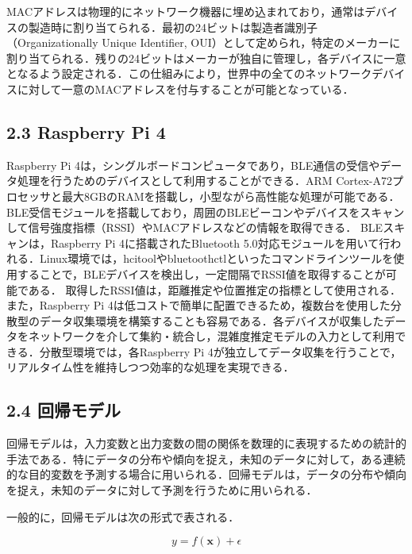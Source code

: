 MACアドレスは物理的にネットワーク機器に埋め込まれており，通常はデバイスの製造時に割り当てられる．最初の24ビットは製造者識別子（Organizationally Unique Identifier, OUI）として定められ，特定のメーカーに割り当てられる．残りの24ビットはメーカーが独自に管理し，各デバイスに一意となるよう設定される．この仕組みにより，世界中の全てのネットワークデバイスに対して一意のMACアドレスを付与することが可能となっている．

\subsection*{2.3 Raspberry Pi 4}
Raspberry Pi 4は，シングルボードコンピュータであり，BLE通信の受信やデータ処理を行うためのデバイスとして利用することができる\cite{rasPi}．ARM Cortex-A72プロセッサと最大8GBのRAMを搭載し，小型ながら高性能な処理が可能である\cite{rasPi}．BLE受信モジュールを搭載しており，周囲のBLEビーコンやデバイスをスキャンして信号強度指標（RSSI）やMACアドレスなどの情報を取得できる\cite{rasPi}．
BLEスキャンは，Raspberry Pi 4に搭載されたBluetooth 5.0対応モジュールを用いて行われる．Linux環境では，hcitoolやbluetoothctlといったコマンドラインツールを使用することで，BLEデバイスを検出し，一定間隔でRSSI値を取得することが可能である．
取得したRSSI値は，距離推定や位置推定の指標として使用される．
また，Raspberry Pi 4は低コストで簡単に配置できるため，複数台を使用した分散型のデータ収集環境を構築することも容易である．各デバイスが収集したデータをネットワークを介して集約・統合し，混雑度推定モデルの入力として利用できる．分散型環境では，各Raspberry Pi 4が独立してデータ収集を行うことで，リアルタイム性を維持しつつ効率的な処理を実現できる．

\subsection*{2.4 回帰モデル}
回帰モデルは，入力変数と出力変数の間の関係を数理的に表現するための統計的手法である\cite{prml}．特にデータの分布や傾向を捉え，未知のデータに対して，ある連続的な目的変数を予測する場合に用いられる．回帰モデルは，データの分布や傾向を捉え，未知のデータに対して予測を行うために用いられる．

一般的に，回帰モデルは次の形式で表される．

\begin{equation}
	y = f(\mathbf{x}) + \epsilon
\end{equation}

